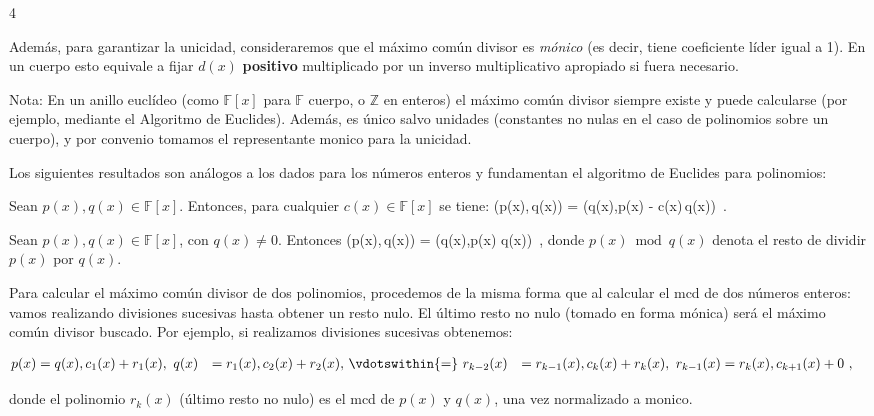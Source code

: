 \documentclass[11pt]{article}
\theoremstyle{plain}
\theoremstyle{definition}
\theoremstyle{definition}
\begin{document}
\begin{multicols}{4}
\begin{tcolorbox}[colback=blue!5!white,colframe=blue!75!black,title=\textbf{Definición (Máximo común divisor)}]
Además, para garantizar la unicidad, consideraremos que el máximo común divisor es \emph{mónico} (es decir, tiene coeficiente líder igual a 1). En un cuerpo esto equivale a fijar $d(x)$ \textbf{positivo} multiplicado por un inverso multiplicativo apropiado si fuera necesario.
\end{tcolorbox}

Nota: En un anillo euclídeo (como $\mathbb{F}[x]$ para $\mathbb{F}$ cuerpo, o $\mathbb{Z}$ en enteros) el máximo común divisor siempre existe y puede calcularse (por ejemplo, mediante el Algoritmo de Euclides). Además, es único salvo unidades (constantes no nulas en el caso de polinomios sobre un cuerpo), y por convenio tomamos el representante monico para la unicidad.

Los siguientes resultados son análogos a los dados para los números enteros y fundamentan el algoritmo de Euclides para polinomios:

\begin{tcolorbox}[colback=red!5!white,colframe=red!75!black,title=\textbf{Lema 2.2.1}]
Sean $p(x), q(x) \in \mathbb{F}[x]$. Entonces, para cualquier $c(x) \in \mathbb{F}[x]$ se tiene:
\big(p(x),\,q(x)\big) = \!\Big(q(x),\;p(x) - c(x)\,q(x)\Big)~.
\end{tcolorbox}

\begin{tcolorbox}[colback=red!5!white,colframe=red!75!black,title=\textbf{Corolario 2.2.2}]
Sean $p(x), q(x) \in \mathbb{F}[x]$, con $q(x) \neq 0$. Entonces
\big(p(x),\,q(x)\big) = \!\Big(q(x),\;p(x) \bmod q(x)\Big)~,
donde $p(x) \bmod q(x)$ denota el resto de dividir $p(x)$ por $q(x)$.
\end{tcolorbox}

Para calcular el máximo común divisor de dos polinomios, procedemos de la misma forma que al calcular el mcd de dos números enteros: vamos realizando divisiones sucesivas hasta obtener un resto nulo. El último resto no nulo (tomado en forma mónica) será el máximo común divisor buscado. Por ejemplo, si realizamos divisiones sucesivas obtenemos:

\begin{align*}
p(x) &= q(x),c_1(x) + r_1(x),\
q(x) &= r_1(x),c_2(x) + r_2(x),\
&\vdotswithin{=}\
r_{k-2}(x) &= r_{k-1}(x),c_k(x) + r_k(x),\
r_{k-1}(x) &= r_k(x),c_{k+1}(x) + 0~,
\end{align*}

donde el polinomio $r_k(x)$ (último resto no nulo) es el mcd de $p(x)$ y $q(x)$, una vez normalizado a monico.


\end{multicols}
\end{document}
